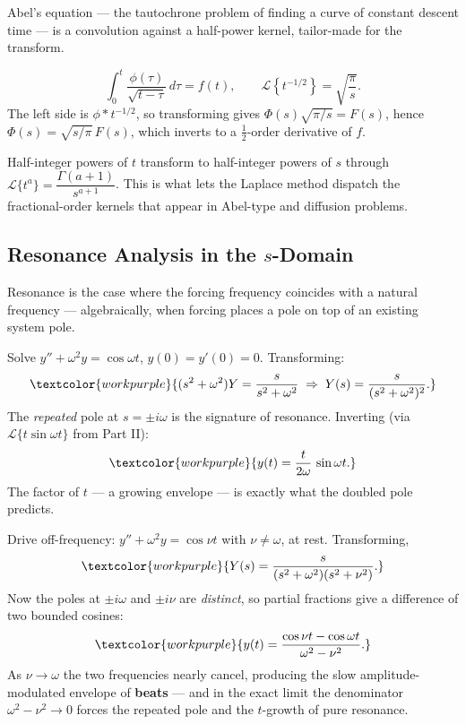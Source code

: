 Abel's equation --- the tautochrone problem of finding a curve of constant descent
time --- is a convolution against a half-power kernel, tailor-made for the transform.

\begin{formulabox}
\[ \int_0^t \frac{\phi(\tau)}{\sqrt{t-\tau}}\,d\tau = f(t), \qquad
   \mathcal{L}\!\left\{ t^{-1/2} \right\} = \sqrt{\frac{\pi}{s}}. \]
The left side is $\phi * t^{-1/2}$, so transforming gives
$\Phi(s)\sqrt{\pi/s} = F(s)$, hence $\Phi(s) = \sqrt{s/\pi}\,F(s)$, which inverts to a
$\tfrac12$-order derivative of $f$.
\end{formulabox}

\begin{conceptbox}
Half-integer powers of $t$ transform to half-integer powers of $s$ through
$\mathcal{L}\{t^{a}\} = \dfrac{\Gamma(a+1)}{s^{a+1}}$. This is what lets the Laplace
method dispatch the \textcolor{accentorange}{fractional-order} kernels that appear in
Abel-type and diffusion problems.
\end{conceptbox}

\subsection{Resonance Analysis in the $s$-Domain}

Resonance is the case where the forcing frequency coincides with a natural frequency
--- algebraically, when forcing places a pole on top of an existing system pole.

\begin{examplebox}
Solve $y'' + \omega^2 y = \cos\omega t$, $y(0)=y'(0)=0$. Transforming:
\[ \textcolor{workpurple}{(s^2+\omega^2)Y = \frac{s}{s^2+\omega^2}
   \;\Rightarrow\; Y(s) = \frac{s}{(s^2+\omega^2)^2}.} \]
The \emph{repeated} pole at $s=\pm i\omega$ is the signature of resonance. Inverting
(via $\mathcal{L}\{t\sin\omega t\}$ from Part II):
\[ \textcolor{workpurple}{y(t) = \frac{t}{2\omega}\,\sin\omega t.} \]
The factor of $t$ --- a growing envelope --- is exactly what the doubled pole
predicts.
\end{examplebox}

\begin{examplebox}
Drive off-frequency: $y'' + \omega^2 y = \cos\nu t$ with $\nu\ne\omega$, at rest.
Transforming,
\[ \textcolor{workpurple}{Y(s) = \frac{s}{(s^2+\omega^2)(s^2+\nu^2)}.} \]
Now the poles at $\pm i\omega$ and $\pm i\nu$ are \emph{distinct}, so partial
fractions give a difference of two bounded cosines:
\[ \textcolor{workpurple}{y(t) = \frac{\cos\nu t - \cos\omega t}{\omega^2 - \nu^2}.} \]
As $\nu\to\omega$ the two frequencies nearly cancel, producing the slow
amplitude-modulated envelope of \textbf{beats} --- and in the exact limit the
denominator $\omega^2-\nu^2\to 0$ forces the repeated pole and the $t$-growth of pure
resonance.
\end{examplebox}

